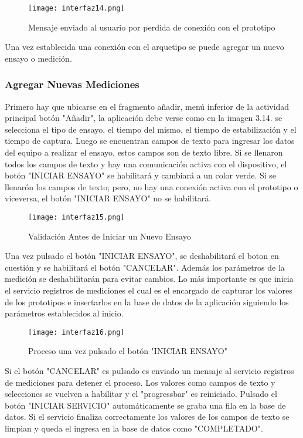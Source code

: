 \begin{figure}[H]
	\centering
	\texttt{[image: interfaz14.png]}
	\caption{Mensaje enviado al usuario por perdida de conexión con el prototipo}
\end{figure}

\par \noindent
Una vez establecida una conexión con el arquetipo se puede agregar un nuevo ensayo o medición.

\subsubsection{Agregar Nuevas Mediciones}

\par 
Primero hay que ubicarse en el fragmento añadir, menú inferior de la actividad principal botón "Añadir", la aplicación debe verse como en la imagen 3.14. se selecciona el tipo de ensayo, el tiempo del mismo, el tiempo de estabilización y el tiempo de captura. Luego se encuentran campos de texto para ingresar los datos del equipo a realizar el ensayo, estos campos son de texto libre. Si se llenaron todos los campos de texto y hay una comunicación activa con el dispositivo, el botón "INICIAR ENSAYO" se habilitará y cambiará a un color verde. Si se llenarón los campos de texto; pero, no hay una conexión activa con el prototipo o viceversa, el botón "INICIAR ENSAYO" no se habilitará.

\begin{figure}[H]
	\centering
	\texttt{[image: interfaz15.png]}
	\caption{Validación Antes de Iniciar un Nuevo Ensayo}
\end{figure}

\par \noindent 
Una vez pulsado el botón "INICIAR ENSAYO", se deshabilitará el boton en cuestión y se habilitará el botón "CANCELAR". Además los parámetros de la medición se deshabilitarán para evitar cambios. Lo más importante es que inicia el servicio registros de mediciones el cual es el encargado de capturar los valores de los prototipos e insertarlos en la base de datos de la aplicación siguiendo los parámetros establecidos al inicio. 

\begin{figure}[H]
	\centering
	\texttt{[image: interfaz16.png]}
	\caption{Proceso una vez pulsado el botón "INICIAR ENSAYO"}
\end{figure}
 
\par \noindent
Si el botón "CANCELAR" es pulsado es enviado un mensaje al servicio registros de mediciones para detener el proceso. Los valores como campos de texto y selecciones se vuelven a habilitar y el "progressbar" es reiniciado. Pulsado el botón "INICIAR SERVICIO" automáticamente se graba una fila en la base de datos. Si el servicio finaliza correctamente los valores de los campos de texto se limpian y queda el ingresa en la base de datos como "COMPLETADO". 


